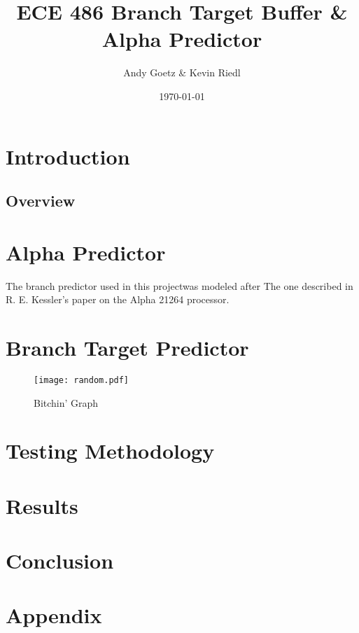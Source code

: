 \documentclass[twocolumn]{article}
\author{\LARGE Andy Goetz \& Kevin Riedl}
\date{\today}
\title{\Huge \textbf{ECE 486 Branch Target Buffer \& Alpha Predictor}}
\newcommand{\centerimage}[3]{
\begin{figure}[ht!]  
\begin{center}
#1
\caption{#2}
\label{#3}
\end{center}
\end{figure}}
\begin{document}
\maketitle
\section{Introduction}
\subsection{Overview}
\section{Alpha Predictor}
The branch predictor used in this projectwas modeled after
The one described in R. E. Kessler's paper on the Alpha 
21264 processor.

\section{Branch Target Predictor}
\centerimage{\texttt{[image: random.pdf]}}{Bitchin' Graph}{bgraph}
\section{Testing Methodology}
\section{Results}
\section{Conclusion}
\section{Appendix}
\end{document}
